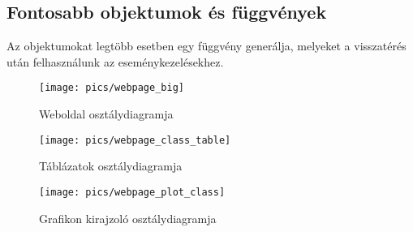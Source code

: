 \subsection{Fontosabb objektumok és függvények}
	\hfill
	Az objektumokat legtöbb esetben egy függvény generálja, melyeket a visszatérés után felhasználunk az eseménykezelésekhez.
	\begin{figure}[h]
		\texttt{[image: pics/webpage\_big]}
		\centering
		\caption{Weboldal osztálydiagramja\label{fig:webpage_big}}
	\end{figure}

	\begin{figure}[h]
		\texttt{[image: pics/webpage\_class\_table]}
		\centering
		\caption{Táblázatok osztálydiagramja\label{fig:webpage_class_table}}
	\end{figure}

	\begin{figure}[h]
		\texttt{[image: pics/webpage\_plot\_class]}
		\centering
		\caption{Grafikon kirajzoló osztálydiagramja\label{fig:webpage_plot_class}}
	\end{figure}

